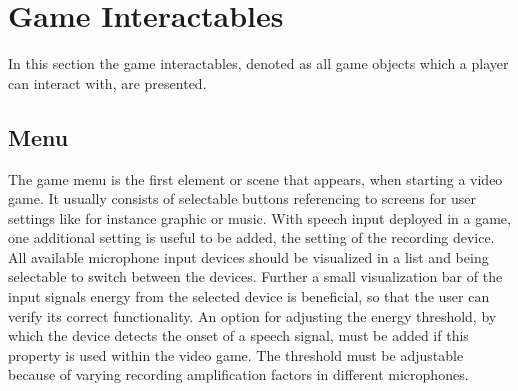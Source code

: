 
\section{Game Interactables}
\thesisStateNotReady
In this section the game interactables, denoted as all game objects which a player can interact with, are presented.

\subsection{Menu}\label{sec:game_interactables_menu}
The game menu is the first element or scene that appears, when starting a video game. 
It usually consists of selectable buttons referencing to screens for user settings like for instance graphic or music.
With speech input deployed in a game, one additional setting is useful to be added, the setting of the recording device.
All available microphone input devices should be visualized in a list and being selectable to switch between the devices.
Further a small visualization bar of the input signals energy from the selected device is beneficial, so that the user can verify its correct functionality.
An option for adjusting the energy threshold, by which the device detects the onset of a speech signal, must be added if this property is used within the video game.
The threshold must be adjustable because of varying recording amplification factors in different microphones.
